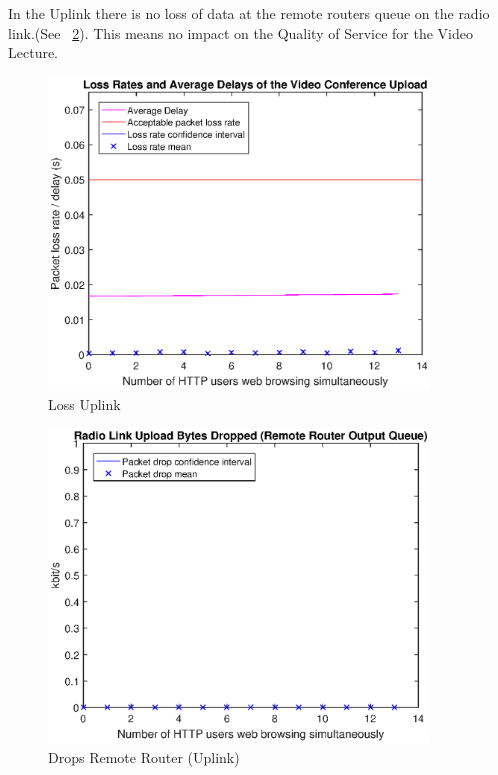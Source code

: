 \documentclass[a4paper,10pt]{book}\usepackage{graphicx}
\begin{document}
In the Uplink there is no loss of data at the remote routers queue on the radio link.(See ~\ref{fig:remoteRdrops}).
This means no impact on the Quality of Service for the Video Lecture.
\begin{figure}[!ht]
  \centering
  
    \includegraphics[width=0.9\textwidth]{off_loss_conf_upload.eps}
    \caption{Loss Uplink}
     \label{fig:losslecup}
\end{figure}
\begin{figure}[!ht]
  \centering
    \includegraphics[width=0.9\textwidth]{on_remote_router_drops.eps}
    \caption{Drops Remote Router (Uplink)}
     \label{fig:remoteRdrops}
\end{figure}
\end{document}
